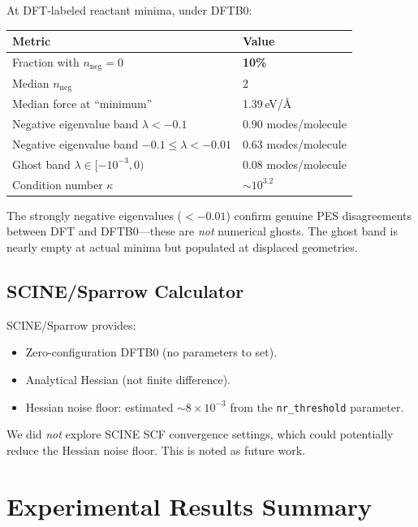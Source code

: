 \documentclass[11pt,a4paper]{article}
\theoremstyle{definition}
\begin{document}
At DFT-labeled reactant minima, under DFTB0:
\begin{center}
\begin{tabular}{ll}
\toprule
Metric & Value \\
\midrule
Fraction with $n_\text{neg}=0$ & \textbf{10\%} \\
Median $n_\text{neg}$ & 2 \\
Median force at ``minimum'' & 1.39\,eV/\AA \\
Negative eigenvalue band $\lambda < -0.1$ & 0.90 modes/molecule \\
Negative eigenvalue band $-0.1 \leq \lambda < -0.01$ & 0.63 modes/molecule \\
Ghost band $\lambda \in [-10^{-3}, 0)$ & 0.08 modes/molecule \\
Condition number $\kappa$ & $\sim 10^{3.2}$ \\
\bottomrule
\end{tabular}
\end{center}

The strongly negative eigenvalues ($<-0.01$) confirm genuine PES disagreements
between DFT and DFTB0---these are \emph{not} numerical ghosts.  The ghost band
is nearly empty at actual minima but populated at displaced geometries.

\subsection{SCINE/Sparrow Calculator}

SCINE/Sparrow provides:
\begin{itemize}[nosep]
  \item Zero-configuration DFTB0 (no parameters to set).
  \item Analytical Hessian (not finite difference).
  \item Hessian noise floor: estimated $\sim 8\times10^{-3}$ from the
    \texttt{nr\_threshold} parameter.
\end{itemize}

We did \emph{not} explore SCINE SCF convergence settings, which could
potentially reduce the Hessian noise floor.  This is noted as future work.

\section{Experimental Results Summary}
\label{sec:experiments}
\end{document}
